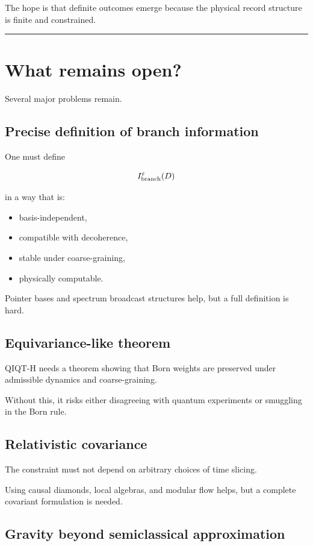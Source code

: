 \documentclass[11pt,a4paper]{article}
\begin{document}
The hope is that definite outcomes emerge because the physical record structure is finite and constrained.

\medskip\hrule\medskip

\section{What remains open?}

Several major problems remain.

\subsection{Precise definition of branch information}

One must define

\[
I_{\rm branch}^{\varepsilon}(D)
\]

in a way that is:

\begin{itemize}
  \item basis-independent,
  \item compatible with decoherence,
  \item stable under coarse-graining,
  \item physically computable.
\end{itemize}

Pointer bases and spectrum broadcast structures help, but a full definition is hard.

\subsection{Equivariance-like theorem}

QIQT-H needs a theorem showing that Born weights are preserved under admissible dynamics and coarse-graining.

Without this, it risks either disagreeing with quantum experiments or smuggling in the Born rule.

\subsection{Relativistic covariance}

The constraint must not depend on arbitrary choices of time slicing.

Using causal diamonds, local algebras, and modular flow helps, but a complete covariant formulation is needed.

\subsection{Gravity beyond semiclassical approximation}
\end{document}
